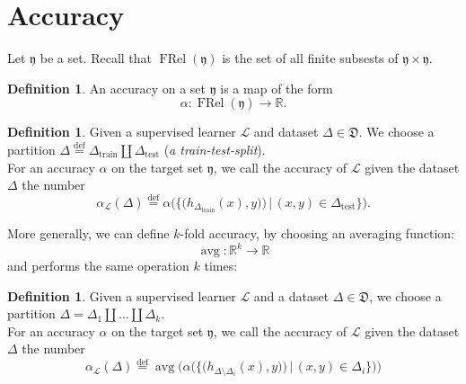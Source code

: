 \documentclass{book}
\theoremstyle{plain}
\theoremstyle{definition}
\newtheorem{definition}[corollary]{Definition}
\DeclareMathOperator{\avg}{avg}
\renewcommand{\d}[1]{\mathbb{#1}}
\newcommand{\define}{\stackrel{\operatorname{def}}{=}}
\newcommand{\f}[1]{\mathfrak{#1}}
\DeclareMathOperator{\FRel}{FRel}
\newcommand{\mor}{\longrightarrow}
\renewcommand{\r}[1]{\mathcal{#1}}
\DeclareMathOperator{\test}{test}
\DeclareMathOperator{\train}{train}
\renewcommand{\r}[1]{\mathcal{#1}}
\begin{document}
\section{Accuracy}
Let $\f{y}$ be a set. Recall that $\FRel(\f{y})$ is the set of all finite subsests of $\f{y}\times \f{y}$.
\begin{definition}
An accuracy on a set $\f{y}$ is a map of the form
\[
\alpha: \FRel(\f{y})\mor \d{R}.
\]
\end{definition}
\begin{definition}
Given a supervised learner $\r{L}$ and dataset $\Delta \in \f{D}$. We choose a partition $\Delta \define \Delta_{\train}\coprod \Delta_{\test}$ (\emph{a train-test-split}).\\
For an accuracy $\alpha$ on the target set $\f{y}$, we call the accuracy of $\r{L}$ given the dataset $\Delta$ the number
\[
\alpha_\r{L}(\Delta)\define \alpha  \bigg(  \big\{ \big( h_{\Delta_{\train}}  (x),y)  \big) \,\bigg\vert \,(x,y)\in \Delta_{\test} \big\}\bigg).
\]
\end{definition}

\noindent More generally, we can define $k$-fold accuracy, by choosing an averaging function:
\[
\avg: \d{R}^k\mor \d{R}
\]
and performs the same operation $k$ times:
\begin{definition}
Given a supervised learner $\r{L}$ and a dataset $\Delta \in \f{D}$, we choose a partition $\Delta = \Delta_1 \coprod \ldots \coprod \Delta_k$.\\
For an accuracy $\alpha$ on the target set $\f{y}$, we call the accuracy of $\r{L}$ given the dataset $\Delta$ the number
\[
\alpha_\r{L}(\Delta)\define \avg\bigg(\alpha\big(\big\{ \big( h_{\Delta\setminus \Delta_i}(x),y)  \big) \,\bigg\vert \,(x,y)\in \Delta_i \big\}\big)\bigg)
\]
\end{definition}
\end{document}
